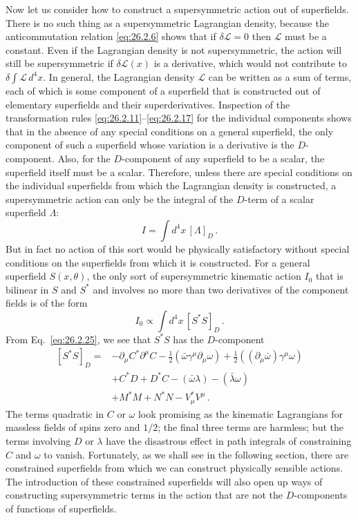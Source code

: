 Now let us consider how to construct a supersymmetric action out of
superfields. There is no such thing as a supersymmetric Lagrangian density,
because the anticommutation relation \eqref{eq:26.2.6} shows that if
$\delta\mathcal{L}=0$ then $\mathcal{L}$ must be a constant. Even if the
Lagrangian density is not supersymmetric, the action will still be
supersymmetric if $\delta\mathcal{L}(x)$ is a derivative, which would not
contribute to $\delta\int\mathcal{L}\,d^4x$. In general, the Lagrangian
density $\mathcal{L}$ can be written as a sum of terms, each of which is some
component of a superfield that is constructed out of elementary superfields
and their superderivatives. Inspection of the transformation rules
\eqref{eq:26.2.11}--\eqref{eq:26.2.17} for the individual components shows
that in the absence of any special conditions on a general superfield, the
only component of such a superfield whose variation is a derivative is the
$D$-component. Also, for the $D$-component of any superfield to be a scalar,
the superfield itself must be a scalar. Therefore, unless there are special
conditions on the individual superfields from which the Lagrangian density is
constructed, a supersymmetric action can only be the integral of the
$D$-term of a scalar superfield $\Lambda$:
\begin{equation}
  I=\int d^4x\,[\Lambda]_D\,.
  \tag{26.2.31}\label{eq:26.2.31}
\end{equation}
But in fact no action of this sort would be physically satisfactory without
special conditions on the superfields from which it is constructed. For a
general superfield $S(x,\theta)$, the only sort of supersymmetric kinematic
action $I_0$ that is bilinear in $S$ and $S^*$ and involves no more than two
derivatives of the component fields is of the form
\begin{equation}
  I_0\mathrel{\propto}\int d^4x\,[S^*S]_D\,.
  \tag{26.2.32}\label{eq:26.2.32}
\end{equation}
From Eq.~\eqref{eq:26.2.25}, we see that $S^*S$ has the $D$-component
\begin{equation}
  \begin{aligned}
  [S^*S]_D={}&-\partial_\mu C^*\partial^\mu C
  -\frac12(\bar\omega\gamma^\mu\partial_\mu\omega)
  +\frac12((\partial_\mu\bar\omega)\gamma^\mu\omega)\\
  &+C^*D+D^*C-(\bar\omega\lambda)-(\bar\lambda\omega)\\
  &+M^*M+N^*N-V_\mu^*V^\mu\,.
  \end{aligned}
  \tag{26.2.33}\label{eq:26.2.33}
\end{equation}
The terms quadratic in $C$ or $\omega$ look promising as the kinematic
Lagrangians for massless fields of spins zero and $1/2$; the final three terms
are harmless; but the terms involving $D$ or $\lambda$ have the disastrous
effect in path integrals of constraining $C$ and $\omega$ to vanish.
Fortunately, as we shall see in the following section, there are constrained
superfields from which we can construct physically sensible actions. The
introduction of these constrained superfields will also open up ways of
constructing supersymmetric terms in the action that are not the
$D$-components of functions of superfields.

